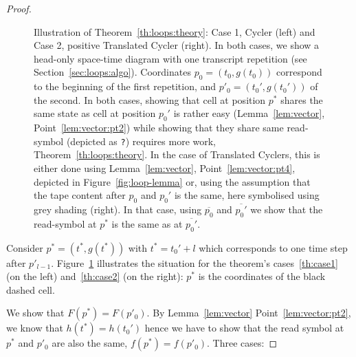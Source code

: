 \begin{proof}
\begin{figure}[h!]
\begin{minipage}[t]{0.5\textwidth}
{\begin{tikzpicture}[every node/.style={minimum size=6mm, draw, font=\scriptsize}, scale=1]



                \end{tikzpicture}
            }
        \end{minipage}
        \caption{Illustration of Theorem~\ref{th:loops:theory}: Case 1, Cycler (left) and Case 2, positive Translated Cycler (right). In both cases, we show a head-only space-time diagram with one transcript repetition (see Section~\ref{sec:loops:algo}). Coordinates $p_0 = (t_0,g(t_0))$ correspond to the beginning of the first repetition, and $p'_0 = (t_0',g(t_0'))$ of the second. In both cases, showing that cell at position $p^*$ shares the same state as cell at position $p_0'$ is rather easy (Lemma~\ref{lem:vector}, Point~\ref{lem:vector:pt2}) while showing that they share same read-symbol (depicted as \texttt{?}) requires more work, Theorem~\ref{th:loops:theory}. In the case of Translated Cyclers, this is either done using Lemma~\ref{lem:vector}, Point~\ref{lem:vector:pt4}, depicted in Figure~\ref{fig:loop-lemma} or, using the assumption that the tape content after $p_0$ and $p_0'$ is the same, here symbolised using grey shading (right). In that case, using $\overline{p_0}$ and $\overline{p_0'}$ we show that the read-symbol at $p^*$ is the same as at $\overline{p_0'}$.}\label{fig:loop-proof}
    \end{figure}

    Consider $p^* = (t^*, g(t^*))$ with $t^*=t_0'+l$ which corresponds to one time step after $p'_{l-1}$. Figure~\ref{fig:loop-proof} illustrates the situation for the theorem's cases~\ref{th:case1} (on the left) and~\ref{th:case2} (on the right): $p^*$ is the coordinates of the black dashed cell.

    We show that $F(p^*) = F(p'_0)$. By Lemma~\ref{lem:vector} Point~\ref{lem:vector:pt2}, we know that $h(t^*) = h(t_0')$ hence we have to show that the read symbol at $p^*$ and $p'_0$ are also the same, \ie $f(p^*) = f(p'_0)$. Three cases:


\end{proof}
